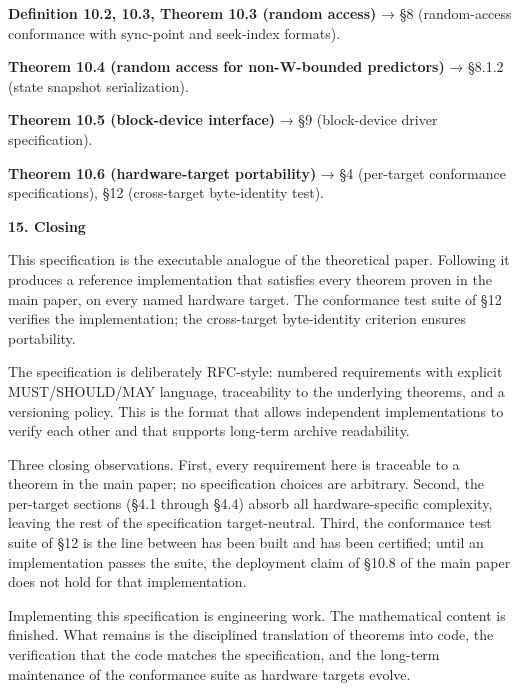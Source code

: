 \documentclass[
]{article}
\begin{document}
\textbf{Definition 10.2, 10.3, Theorem 10.3 (random access)} → §8
(random-access conformance with sync-point and seek-index formats).

\textbf{Theorem 10.4 (random access for non-W-bounded predictors)} →
§8.1.2 (state snapshot serialization).

\textbf{Theorem 10.5 (block-device interface)} → §9 (block-device driver
specification).

\textbf{Theorem 10.6 (hardware-target portability)} → §4 (per-target
conformance specifications), §12 (cross-target byte-identity test).

\textbf{15. Closing}

This specification is the executable analogue of the theoretical paper.
Following it produces a reference implementation that satisfies every
theorem proven in the main paper, on every named hardware target. The
conformance test suite of §12 verifies the implementation; the
cross-target byte-identity criterion ensures portability.

The specification is deliberately RFC-style: numbered requirements with
explicit MUST/SHOULD/MAY language, traceability to the underlying
theorems, and a versioning policy. This is the format that allows
independent implementations to verify each other and that supports
long-term archive readability.

Three closing observations. First, every requirement here is traceable
to a theorem in the main paper; no specification choices are arbitrary.
Second, the per-target sections (§4.1 through §4.4) absorb all
hardware-specific complexity, leaving the rest of the specification
target-neutral. Third, the conformance test suite of §12 is the line
between \textquotesingle has been built\textquotesingle{} and
\textquotesingle has been certified\textquotesingle; until an
implementation passes the suite, the deployment claim of §10.8 of the
main paper does not hold for that implementation.

Implementing this specification is engineering work. The mathematical
content is finished. What remains is the disciplined translation of
theorems into code, the verification that the code matches the
specification, and the long-term maintenance of the conformance suite as
hardware targets evolve.
\end{document}
